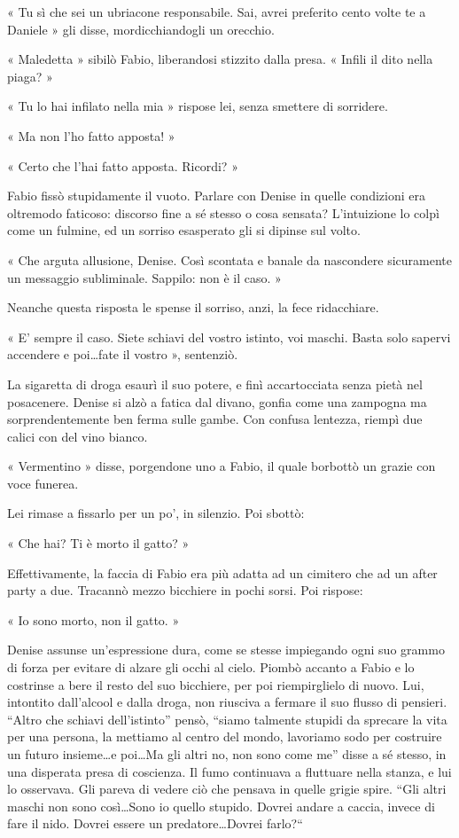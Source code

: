 « Tu sì che sei un ubriacone responsabile. Sai, avrei preferito cento volte te a Daniele » gli disse, mordicchiandogli un orecchio.

« Maledetta » sibilò Fabio, liberandosi stizzito dalla presa. « Infili il dito nella piaga? »

« Tu lo hai infilato nella mia » rispose lei, senza smettere di sorridere.

« Ma non l'ho fatto apposta! »

« Certo che l'hai fatto apposta. Ricordi? »

Fabio fissò stupidamente il vuoto. Parlare con Denise in quelle condizioni era oltremodo faticoso: discorso fine a sé stesso o cosa sensata? L'intuizione lo colpì come un fulmine, ed un sorriso esasperato gli si dipinse sul volto.

« Che arguta allusione, Denise. Così scontata e banale da nascondere sicuramente un messaggio subliminale. Sappilo: non è il caso. »

Neanche questa risposta le spense il sorriso, anzi, la fece ridacchiare.

« E' sempre il caso. Siete schiavi del vostro istinto, voi maschi. Basta solo sapervi accendere e poi\ldots fate il vostro », sentenziò.

La sigaretta di droga esaurì il suo potere, e finì accartocciata senza pietà nel posacenere. Denise si alzò a fatica dal divano, gonfia come una zampogna ma sorprendentemente ben ferma sulle gambe. Con confusa lentezza, riempì due calici con del vino bianco.

« Vermentino » disse, porgendone uno a Fabio, il quale borbottò un grazie con voce funerea.

Lei rimase a fissarlo per un po', in silenzio. Poi sbottò:

« Che hai? Ti è morto il gatto? »

Effettivamente, la faccia di Fabio era più adatta ad un cimitero che ad un after party a due. Tracannò mezzo bicchiere in pochi sorsi. Poi rispose:

« Io sono morto, non il gatto. »

Denise assunse un'espressione dura, come se stesse impiegando ogni suo grammo di forza per evitare di alzare gli occhi al cielo. Piombò accanto a Fabio e lo costrinse a bere il resto del suo bicchiere, per poi riempirglielo di nuovo. Lui, intontito dall'alcool e dalla droga, non riusciva a fermare il suo flusso di pensieri. ``Altro che schiavi dell'istinto'' pensò, ``siamo talmente stupidi da sprecare la vita per una persona, la mettiamo al centro del mondo, lavoriamo sodo per costruire un futuro insieme\ldots e poi\ldots Ma gli altri no, non sono come me'' disse a sé stesso, in una disperata presa di coscienza. Il fumo continuava a fluttuare nella stanza, e lui lo osservava. Gli pareva di vedere ciò che pensava in quelle grigie spire. ``Gli altri maschi non sono così\ldots Sono io quello stupido. Dovrei andare a caccia, invece di fare il nido. Dovrei essere un predatore\ldots Dovrei farlo?``

